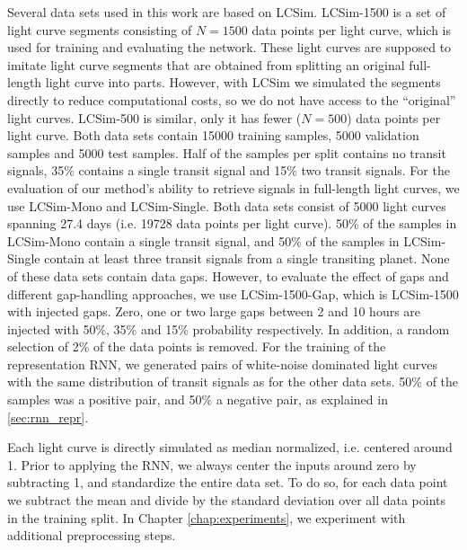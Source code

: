 Several data sets used in this work are based on LCSim. LCSim-1500 is a set of light curve segments consisting of $N=1500$ data points per light curve, which is used for training and evaluating the network. These light curves are supposed to imitate light curve segments that are obtained from splitting an original full-length light curve into parts. However, with LCSim we simulated the segments directly to reduce computational costs, so we do not have access to the ``original'' light curves. LCSim-500 is similar, only it has fewer ($N=500$) data points per light curve. Both data sets contain 15000 training samples, 5000 validation samples and 5000 test samples. Half of the samples per split contains no transit signals, 35\% contains a single transit signal and 15\% two transit signals. For the evaluation of our method's ability to retrieve signals in full-length light curves, we use LCSim-Mono and LCSim-Single. Both data sets consist of 5000 light curves spanning 27.4 days (i.e. 19728 data points per light curve). 50\% of the samples in LCSim-Mono contain a single transit signal, and 50\% of the samples in LCSim-Single contain at least three transit signals from a single transiting planet. None of these data sets contain data gaps. However, to evaluate the effect of gaps and different gap-handling approaches, we use LCSim-1500-Gap, which is LCSim-1500 with injected gaps. Zero, one or two large gaps between 2 and 10 hours are injected with 50\%, 35\% and 15\% probability respectively. In addition, a random selection of 2\% of the data points is removed. For the training of the representation RNN, we generated pairs of white-noise dominated light curves with the same distribution of transit signals as for the other data sets. 50\% of the samples was a positive pair, and 50\% a negative pair, as explained in \ref{sec:rnn_repr}.

Each light curve is directly simulated as median normalized, i.e. centered around 1. Prior to applying the RNN, we always center the inputs around zero by subtracting 1, and standardize the entire data set. To do so, for each data point we subtract the mean and divide by the standard deviation over all data points in the training split. In Chapter \ref{chap:experiments}, we experiment with additional preprocessing steps.



